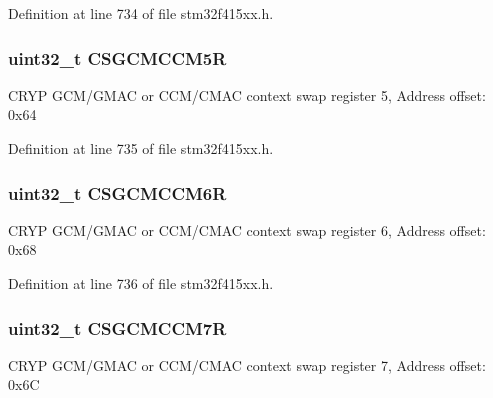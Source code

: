 Definition at line 734 of file stm32f415xx.\+h.

\subsubsection[{\texorpdfstring{C\+S\+G\+C\+M\+C\+C\+M5R}{CSGCMCCM5R}}]{ uint32\+\_\+t C\+S\+G\+C\+M\+C\+C\+M5R}\hypertarget{struct_c_r_y_p___type_def_a18e2b049f39ed894fc37ba092145a115}{}\label{struct_c_r_y_p___type_def_a18e2b049f39ed894fc37ba092145a115}
C\+R\+YP G\+C\+M/\+G\+M\+AC or C\+C\+M/\+C\+M\+AC context swap register 5, Address offset\+: 0x64 

Definition at line 735 of file stm32f415xx.\+h.

\subsubsection[{\texorpdfstring{C\+S\+G\+C\+M\+C\+C\+M6R}{CSGCMCCM6R}}]{ uint32\+\_\+t C\+S\+G\+C\+M\+C\+C\+M6R}\hypertarget{struct_c_r_y_p___type_def_a1062d56f4ea86ece15011e9ffc0e53c3}{}\label{struct_c_r_y_p___type_def_a1062d56f4ea86ece15011e9ffc0e53c3}
C\+R\+YP G\+C\+M/\+G\+M\+AC or C\+C\+M/\+C\+M\+AC context swap register 6, Address offset\+: 0x68 

Definition at line 736 of file stm32f415xx.\+h.

\subsubsection[{\texorpdfstring{C\+S\+G\+C\+M\+C\+C\+M7R}{CSGCMCCM7R}}]{ uint32\+\_\+t C\+S\+G\+C\+M\+C\+C\+M7R}\hypertarget{struct_c_r_y_p___type_def_a7cf7761ae30d9fa41c295c5add31b316}{}\label{struct_c_r_y_p___type_def_a7cf7761ae30d9fa41c295c5add31b316}
C\+R\+YP G\+C\+M/\+G\+M\+AC or C\+C\+M/\+C\+M\+AC context swap register 7, Address offset\+: 0x6C 

